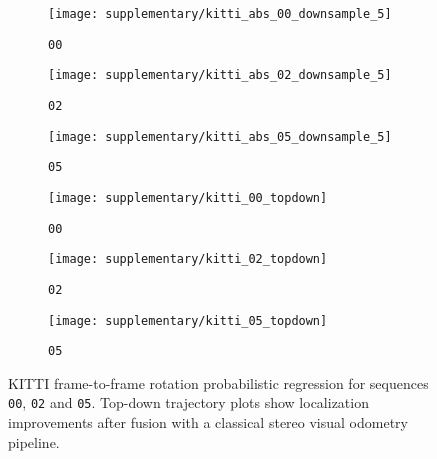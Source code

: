 \begin{figure*}[h!]
	\centering
	\begin{subfigure}[]{0.33\textwidth}
		\texttt{[image: supplementary/kitti\_abs\_00\_downsample\_5]}
		\caption{\texttt{00}}
	\end{subfigure}
	\begin{subfigure}[]{0.33\textwidth} 
		\texttt{[image: supplementary/kitti\_abs\_02\_downsample\_5]}
		\caption{\texttt{02}}
	\end{subfigure}
	\begin{subfigure}[]{0.33\textwidth} 
		\texttt{[image: supplementary/kitti\_abs\_05\_downsample\_5]}
		\caption{\texttt{05}}
	\end{subfigure}
	\begin{subfigure}[]{0.33\textwidth} 
		\texttt{[image: supplementary/kitti\_00\_topdown]}
		\caption{\texttt{00}}
	\end{subfigure}
	\begin{subfigure}[]{0.33\textwidth} 
		\texttt{[image: supplementary/kitti\_02\_topdown]}
		\caption{\texttt{02}}
	\end{subfigure}
	\begin{subfigure}[]{0.33\textwidth} 
		\texttt{[image: supplementary/kitti\_05\_topdown]}
		\caption{\texttt{05}}
	\end{subfigure}
	\caption{KITTI frame-to-frame rotation probabilistic regression for sequences \texttt{00}, \texttt{02} and \texttt{05}. Top-down trajectory plots show localization improvements after fusion with a classical stereo visual odometry pipeline.}
	\label{fig:kitti_regression}
\end{figure*}


